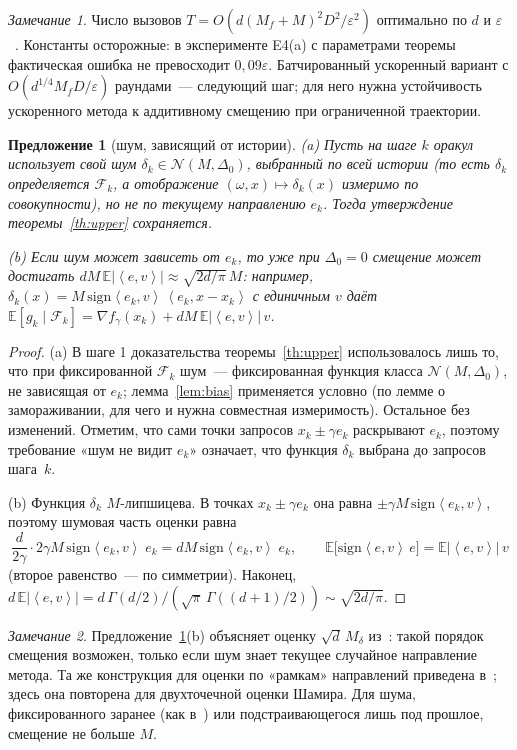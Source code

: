 \documentclass[12pt,a4paper]{article}
\theoremstyle{plain}
\newtheorem{proposition}{Предложение}
\theoremstyle{definition}
\theoremstyle{remark}
\newtheorem*{remark}{Замечание}
\newcommand{\E}{\mathbb{E}}
\newcommand{\eps}{\varepsilon}
\newcommand{\abs}[1]{\left\lvert #1\right\rvert}
\newcommand{\ip}[2]{\left\langle #1,#2\right\rangle}
\newcommand{\F}{\mathcal F}
\begin{document}
\begin{remark}
Число вызовов $T=O(d(M_f+M)^2D^2/\eps^2)$ оптимально по $d$ и $\eps$~\cite{duchi}. Константы осторожные: в эксперименте E4(a) с параметрами теоремы фактическая ошибка не превосходит $0{,}09\eps$. Батчированный ускоренный вариант с $O(d^{1/4}M_fD/\eps)$ раундами~--- следующий шаг; для него нужна устойчивость ускоренного метода к аддитивному смещению при ограниченной траектории.
\end{remark}

\begin{proposition}[шум, зависящий от истории]\label{prop:adaptive}
(a) Пусть на шаге $k$ оракул использует свой шум $\delta_k\in\mathcal N(M,\Delta_0)$, выбранный по всей истории (то есть $\delta_k$ определяется $\F_k$, а отображение $(\omega,x)\mapsto\delta_k(x)$ измеримо по совокупности), но не по текущему направлению $e_k$. Тогда утверждение теоремы~\ref{th:upper} сохраняется.

(b) Если шум может зависеть от $e_k$, то уже при $\Delta_0=0$ смещение может достигать $dM\,\E\abs{\ip{e}{v}}\approx\sqrt{2d/\pi}\,M$: например, $\delta_k(x)=M\,\mathrm{sign}\ip{e_k}v\,\ip{e_k}{x-x_k}$ с единичным $v$ даёт $\E[g_k\mid\F_k]=\nabla f_\gamma(x_k)+dM\,\E\abs{\ip ev}\,v$.
\end{proposition}
\begin{proof}
(a) В шаге 1 доказательства теоремы~\ref{th:upper} использовалось лишь то, что при фиксированной $\F_k$ шум~--- фиксированная функция класса $\mathcal N(M,\Delta_0)$, не зависящая от $e_k$; лемма~\ref{lem:bias} применяется условно (по лемме о замораживании, для чего и нужна совместная измеримость). Остальное без изменений. Отметим, что сами точки запросов $x_k\pm\gamma e_k$ раскрывают $e_k$, поэтому требование «шум не видит $e_k$» означает, что функция $\delta_k$ выбрана до запросов шага~$k$.

(b) Функция $\delta_k$ $M$-липшицева. В точках $x_k\pm\gamma e_k$ она равна $\pm\gamma M\,\mathrm{sign}\ip{e_k}v$, поэтому шумовая часть оценки равна
\[\frac d{2\gamma}\cdot2\gamma M\,\mathrm{sign}\ip{e_k}v\;e_k=dM\,\mathrm{sign}\ip{e_k}v\;e_k,\qquad\E\bigl[\mathrm{sign}\ip ev\,e\bigr]=\E\abs{\ip ev}\,v\]
(второе равенство~--- по симметрии). Наконец, $d\,\E\abs{\ip ev}=d\,\Gamma(d/2)/(\sqrt\pi\,\Gamma((d+1)/2))\sim\sqrt{2d/\pi}$.
\end{proof}

\begin{remark}
Предложение~\ref{prop:adaptive}(b) объясняет оценку $\sqrt d\,M_\delta$ из~\cite{DTTG23}: такой порядок смещения возможен, только если шум знает текущее случайное направление метода. Та же конструкция для оценки по «рамкам» направлений приведена в~\cite[замечание~D.5]{LDT26}; здесь она повторена для двухточечной оценки Шамира. Для шума, фиксированного заранее (как в~\cite{DTTG23}) или подстраивающегося лишь под прошлое, смещение не больше $M$.
\end{remark}
\end{document}
